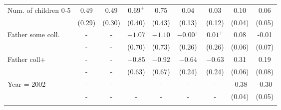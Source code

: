 \begin{tabular}{lcccccccc}
Num. of children 0-5&$0.49$&$0.49$&$0.69^{+}$&$0.75$&$0.04$&$0.03$&0.10&0.06\\
&(0.29)&(0.30)&(0.40)&(0.43)&(0.13)&(0.12)&(0.04)&(0.05)\\
Father some coll.&-&-&$-1.07$&$-1.10$&$-0.00^{+}$&$0.01^{+}$&0.08&-0.01\\
&-&-&(0.70)&(0.73)&(0.26)&(0.26)&(0.06)&(0.07)\\
Father coll+&-&-&$-0.85$&$-0.92$&$-0.64$&$-0.63$&0.31&0.19\\
&-&-&(0.63)&(0.67)&(0.24)&(0.24)&(0.06)&(0.08)\\
Year = 2002&-&-&-&-&-&-&-0.38&-0.30\\
&-&-&-&-&-&-&(0.04)&(0.05)\\
\\
\bottomrule\end{tabular}